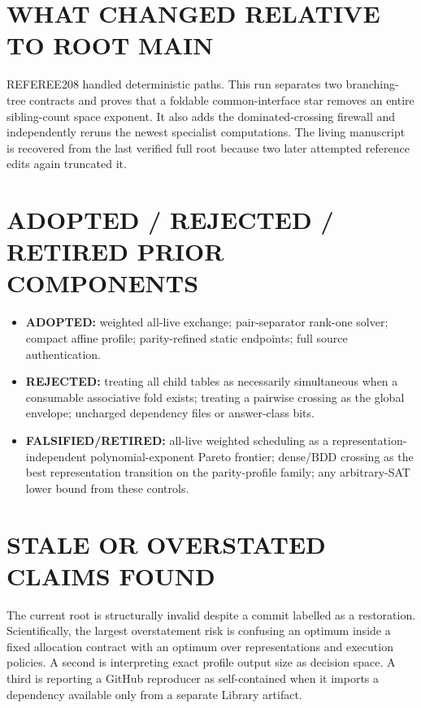 \documentclass[11pt]{article}
\begin{document}
\section{WHAT CHANGED RELATIVE TO ROOT MAIN}

REFEREE208 handled deterministic paths.  This run separates two branching-tree contracts and proves
that a foldable common-interface star removes an entire sibling-count space exponent.  It also adds
the dominated-crossing firewall and independently reruns the newest specialist computations.  The
living manuscript is recovered from the last verified full root because two later attempted
reference edits again truncated it.

\section{ADOPTED / REJECTED / RETIRED PRIOR COMPONENTS}

\begin{itemize}
\item \textbf{ADOPTED:} weighted all-live exchange; pair-separator rank-one solver; compact affine
profile; parity-refined static endpoints; full source authentication.
\item \textbf{REJECTED:} treating all child tables as necessarily simultaneous when a consumable
associative fold exists; treating a pairwise crossing as the global envelope; uncharged dependency
files or answer-class bits.
\item \textbf{FALSIFIED/RETIRED:} all-live weighted scheduling as a representation-independent
polynomial-exponent Pareto frontier; dense/BDD crossing as the best representation transition on the
parity-profile family; any arbitrary-SAT lower bound from these controls.
\end{itemize}

\section{STALE OR OVERSTATED CLAIMS FOUND}

The current root is structurally invalid despite a commit labelled as a restoration.  Scientifically,
the largest overstatement risk is confusing an optimum inside a fixed allocation contract with an
optimum over representations and execution policies.  A second is interpreting exact profile output
size as decision space.  A third is reporting a GitHub reproducer as self-contained when it imports a
dependency available only from a separate Library artifact.
\end{document}
